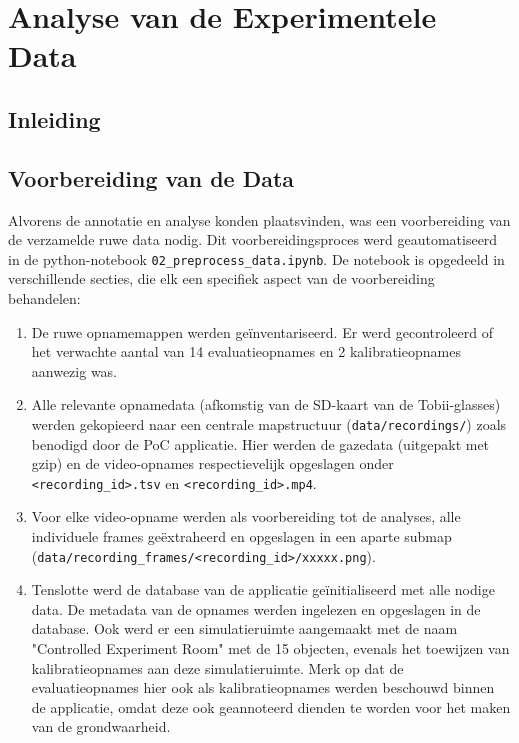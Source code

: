 \chapter{Analyse van de Experimentele Data}
\label{ch:analyse}

\section{Inleiding}


\section{Voorbereiding van de Data}

Alvorens de annotatie en analyse konden plaatsvinden, was een voorbereiding van de verzamelde ruwe data nodig.
Dit voorbereidingsproces werd geautomatiseerd in de python-notebook \texttt{02\_preprocess\_data.ipynb}.
De notebook is opgedeeld in verschillende secties, die elk een specifiek aspect van de voorbereiding behandelen:
\begin{enumerate}
    \item De ruwe opnamemappen werden geïnventariseerd. Er werd gecontroleerd of het verwachte aantal van 14 evaluatieopnames 
    en 2 kalibratieopnames aanwezig was.
    \item Alle relevante opnamedata (afkomstig van de SD-kaart van de Tobii-glasses) werden gekopieerd naar een centrale 
    mapstructuur (\texttt{data/recordings/}) zoals benodigd door de PoC applicatie.
    Hier werden de gazedata (uitgepakt met gzip) en de video-opnames respectievelijk opgeslagen onder \texttt{<recording\_id>.tsv} 
    en \texttt{<recording\_id>.mp4}.
    \item Voor elke video-opname werden als voorbereiding tot de analyses, alle individuele frames geëxtraheerd en opgeslagen 
    in een aparte submap (\texttt{data/recording\_frames/<recording\_id>/xxxxx.png}).
    \item Tenslotte werd de database van de applicatie geïnitialiseerd met alle nodige data. De metadata van de opnames werden 
    ingelezen en opgeslagen in de database.
    Ook werd er een simulatieruimte aangemaakt met de naam "Controlled Experiment Room" met de 15 objecten, evenals het toewijzen 
    van kalibratieopnames aan deze simulatieruimte.
    Merk op dat de evaluatieopnames hier ook als kalibratieopnames werden beschouwd binnen de applicatie, omdat deze ook geannoteerd 
    dienden te worden voor het maken van de grondwaarheid.
\end{enumerate}

